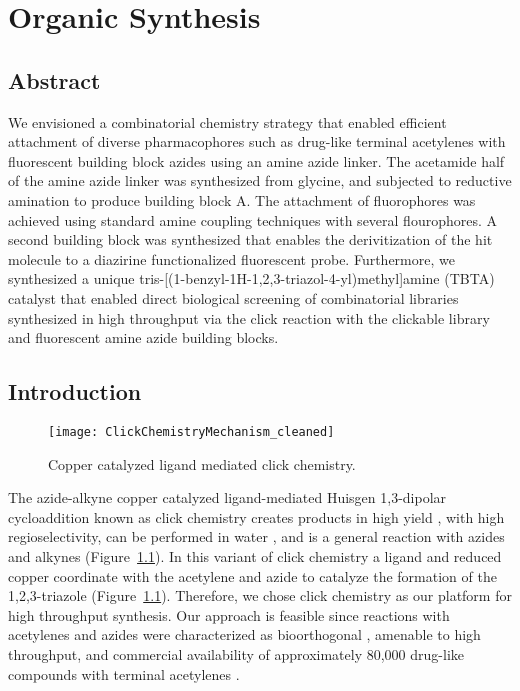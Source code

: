 \chapter{Organic Synthesis}

\section{Abstract}

We envisioned a combinatorial chemistry strategy that enabled efficient attachment of diverse pharmacophores such as drug-like terminal acetylenes with fluorescent building block azides using an amine azide linker. The acetamide half of the amine azide linker was synthesized from glycine, and subjected to reductive amination to produce building block A. The attachment of fluorophores was achieved using standard amine coupling techniques with several flourophores. A second building block was synthesized that enables the derivitization of the hit molecule to a diazirine functionalized fluorescent probe. Furthermore, we synthesized a unique tris-[(1-benzyl-1H-1,2,3-triazol-4-yl)methyl]amine (TBTA) catalyst that enabled direct biological screening of combinatorial libraries synthesized in high throughput via the click reaction with the clickable library and fluorescent amine azide building blocks. 

\section{Introduction}

\begin{figure}
\centering
\texttt{[image: ClickChemistryMechanism\_cleaned]}
\caption{Copper catalyzed ligand mediated click chemistry.}
\label{fig:ClickChemistry}
\end{figure}

The azide-alkyne copper catalyzed ligand-mediated \cite{chan2004polytriazoles} Huisgen 1,3-dipolar cycloaddition known as click chemistry \cite{kolb2001click} creates products in high yield \cite{himo2005copper}, with high regioselectivity, can be performed in water \cite{kolb2001click}, and is a general reaction with azides and alkynes (Figure~\ref{fig:ClickChemistry}). In this variant of click chemistry a ligand and reduced copper coordinate with the acetylene and azide to catalyze the formation of the 1,2,3-triazole (Figure~\ref{fig:ClickChemistry}). Therefore, we chose click chemistry as our platform for high throughput synthesis. Our approach is feasible since reactions with acetylenes and azides were characterized as bioorthogonal \cite{agard2006comparative}, amenable to high throughput, and commercial availability of approximately 80,000 drug-like compounds with terminal acetylenes \cite{irwin2005zinc}.

